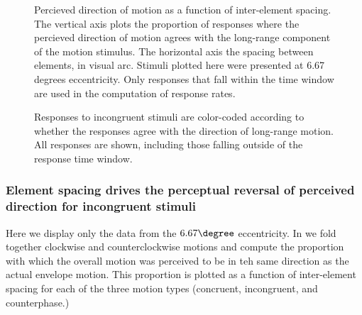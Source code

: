 \documentclass[english,jou]{article}
\begin{document}
\begin{figure}









\caption{\label{fig:rawdata}\label{fig:raw-response-rates}Percieved direction
of motion as a function of inter-element spacing. The vertical axis
plots the proportion of responses where the percieved direction of
motion agrees with the long-range component of the motion stimulus.
The horizontal axis the spacing between elements, in visual arc. Stimuli
plotted here were presented at 6.67 degrees eccentricity. Only responses
that fall within the time window are used in the computation of response
rates.}
\end{figure}
\begin{figure}









\caption{\label{fig:response-times}Responses to incongruent stimuli are color-coded
according to whether the responses agree with the direction of long-range
motion. All responses are shown, including those falling outside of
the response time window.}
\end{figure}



\subsubsection{Element spacing drives the perceptual reversal of perceived direction
for incongruent stimuli}

Here we display only the data from the $6.67\degree$ eccentricity.
In we fold together clockwise and counterclockwise
motions and compute the proportion with which the overall motion was
perceived to be in teh same direction as the actual envelope motion.
This proportion is plotted as a function of inter-element spacing
for each of the three motion types (concruent, incongruent, and counterphase.)
\end{document}
